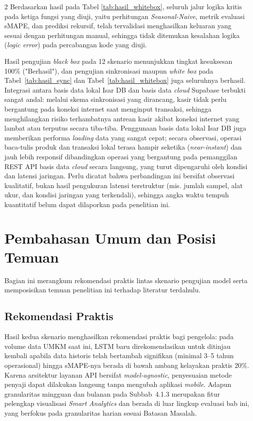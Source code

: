 \documentclass[12pt, a4paper, onecolumn, oneside]{report}
\begin{document}
\begin{spacing}{2}
Berdasarkan hasil pada Tabel \ref{tab:hasil_whitebox}, seluruh jalur logika kritis pada ketiga fungsi yang diuji, yaitu perhitungan \textit{Seasonal-Naive}, metrik evaluasi sMAPE, dan prediksi rekursif, telah tervalidasi menghasilkan keluaran yang sesuai dengan perhitungan manual, sehingga tidak ditemukan kesalahan logika (\textit{logic error}) pada percabangan kode yang diuji.

Hasil pengujian \textit{black box} pada 12 skenario menunjukkan tingkat kesuksesan 100\% ("Berhasil"), dan pengujian sinkronisasi maupun \textit{white box} pada Tabel~\ref{tab:hasil_sync} dan Tabel~\ref{tab:hasil_whitebox} juga seluruhnya berhasil. Integrasi antara basis data lokal Isar DB dan basis data \textit{cloud} Supabase terbukti sangat andal: melalui skema sinkronisasi yang dirancang, kasir tidak perlu bergantung pada koneksi internet saat menginput transaksi, sehingga menghilangkan risiko terhambatnya antrean kasir akibat koneksi internet yang lambat atau terputus secara tiba-tiba. Penggunaan basis data lokal Isar DB juga memberikan performa \textit{loading} data yang sangat cepat; secara observasi, operasi baca-tulis produk dan transaksi lokal terasa hampir seketika (\textit{near-instant}) dan jauh lebih responsif dibandingkan operasi yang bergantung pada pemanggilan REST API basis data \textit{cloud} secara langsung, yang turut dipengaruhi oleh kondisi dan latensi jaringan. Perlu dicatat bahwa perbandingan ini bersifat observasi kualitatif, bukan hasil pengukuran latensi terstruktur (mis. jumlah sampel, alat ukur, dan kondisi jaringan yang terkendali), sehingga angka waktu tempuh kuantitatif belum dapat dilaporkan pada penelitian ini.

\section{Pembahasan Umum dan Posisi Temuan}

Bagian ini merangkum rekomendasi praktis lintas skenario pengujian model serta memposisikan temuan penelitian ini terhadap literatur terdahulu.

\subsection{Rekomendasi Praktis}
Hasil kedua skenario menghasilkan rekomendasi praktis bagi pengelola: pada volume data UMKM saat ini, LSTM baru direkomendasikan untuk ditinjau kembali apabila data historis telah bertambah signifikan (minimal 3--5 tahun operasional) hingga sMAPE-nya berada di bawah ambang kelayakan praktis 20\%. Karena arsitektur layanan API bersifat \textit{model-agnostic}, penyesuaian metode penyaji dapat dilakukan langsung tanpa mengubah aplikasi \textit{mobile}. Adapun granularitas mingguan dan bulanan pada Subbab~4.1.3 merupakan fitur pelengkap visualisasi \textit{Smart Analytics} dan berada di luar lingkup evaluasi bab ini, yang berfokus pada granularitas harian sesuai Batasan Masalah.


\end{spacing}
\end{document}
